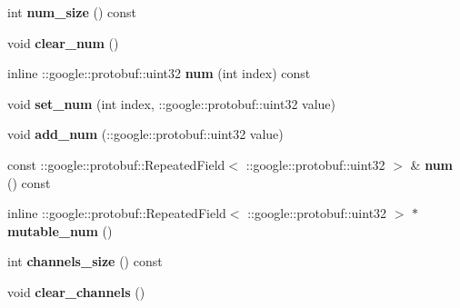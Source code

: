 \begin{DoxyCompactItemize}
\item 
\mbox{\label{classcaffe_1_1_dummy_data_parameter_ad8e0a996ea7cb3568ed051cb5d728dc8}} 
int {\bfseries num\+\_\+size} () const
\item 
\mbox{\label{classcaffe_1_1_dummy_data_parameter_add9f8110385e40ee540fe125cf832d35}} 
void {\bfseries clear\+\_\+num} ()
\item 
\mbox{\label{classcaffe_1_1_dummy_data_parameter_a98744d83c438c04a2cc087a31bafc390}} 
inline \+::google\+::protobuf\+::uint32 {\bfseries num} (int index) const
\item 
\mbox{\label{classcaffe_1_1_dummy_data_parameter_add477fb4d96403bd5a9e7662c968a71a}} 
void {\bfseries set\+\_\+num} (int index, \+::google\+::protobuf\+::uint32 value)
\item 
\mbox{\label{classcaffe_1_1_dummy_data_parameter_a563475c5350c3fed16ab22bf9bb9d228}} 
void {\bfseries add\+\_\+num} (\+::google\+::protobuf\+::uint32 value)
\item 
\mbox{\label{classcaffe_1_1_dummy_data_parameter_a1b7fa61db38c4aae0c0b7ca5bed7570e}} 
const \+::google\+::protobuf\+::\+Repeated\+Field$<$ \+::google\+::protobuf\+::uint32 $>$ \& {\bfseries num} () const
\item 
\mbox{\label{classcaffe_1_1_dummy_data_parameter_a0ad8c5dae1de869346b8a3ed213eb35d}} 
inline \+::google\+::protobuf\+::\+Repeated\+Field$<$ \+::google\+::protobuf\+::uint32 $>$ $\ast$ {\bfseries mutable\+\_\+num} ()
\item 
\mbox{\label{classcaffe_1_1_dummy_data_parameter_a259f5a1024d45c4fde3721f116e4d477}} 
int {\bfseries channels\+\_\+size} () const
\item 
\mbox{\label{classcaffe_1_1_dummy_data_parameter_ad962eac371440f64d11ad1626152eac8}} 
void {\bfseries clear\+\_\+channels} ()
\item 

\end{DoxyCompactItemize}
